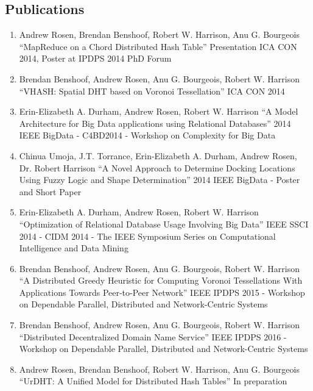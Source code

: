 \documentclass{res}
\begin{document}
\begin{resume}
\section{Publications}
	\begin{enumerate}
	\item Andrew Rosen, Brendan Benshoof, Robert W. Harrison, Anu G. Bourgeois
			``MapReduce on a Chord Distributed Hash Table''
			Presentation ICA CON 2014, Poster at IPDPS 2014 PhD Forum
	\item Brendan Benshoof, Andrew Rosen, Anu G. Bourgeois, Robert W. Harrison
			``VHASH: Spatial DHT based on Voronoi Tessellation''
			ICA CON 2014
	\item  Erin-Elizabeth A. Durham, Andrew Rosen, Robert W. Harrison
    ``A Model Architecture for Big Data applications using Relational Databases''
    2014 IEEE BigData - C4BD2014 - Workshop on Complexity for Big Data
    \item Chinua Umoja, J.T. Torrance, Erin-Elizabeth A. Durham, Andrew Rosen, Dr. Robert Harrison
    	``A Novel Approach to Determine Docking Locations Using Fuzzy Logic and Shape Determination''
    	2014 IEEE BigData - Poster and Short Paper
    \item  Erin-Elizabeth A. Durham, Andrew Rosen, Robert W. Harrison
    ``Optimization of Relational Database Usage Involving Big Data''
     IEEE SSCI 2014 - CIDM 2014 - The IEEE Symposium Series on Computational Intelligence and Data Mining
	\item Brendan Benshoof, Andrew Rosen, Anu G. Bourgeois, Robert W. Harrison
	 ``A Distributed Greedy Heuristic for Computing Voronoi Tessellations With Applications Towards Peer-to-Peer Network''
	IEEE IPDPS 2015 - Workshop on Dependable Parallel, Distributed and Network-Centric Systems
	\item Brendan Benshoof, Andrew Rosen, Anu G. Bourgeois, Robert W. Harrison
	``Distributed Decentralized Domain Name Service''
	IEEE IPDPS 2016 - Workshop on Dependable Parallel, Distributed and Network-Centric Systems
	
	\item Andrew Rosen, Brendan Benshoof, Robert W. Harrison, Anu G. Bourgeois
	``UrDHT: A Unified Model for Distributed Hash Tables''
	In preparation
        

\end{enumerate}
\end{resume}
\end{document}
